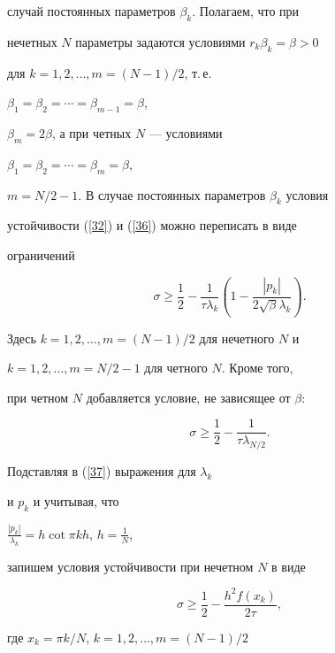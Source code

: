 случай постоянных параметров $\beta_k $. Полагаем, что при


нечетных $N$ параметры задаются условиями $r_k \beta_k=\beta> 0$


для $k=1,2,\dotsc,m=(N-1)/2$, т.\,е.


$\beta_1=\beta_2=\dotsb=\beta_{m-1}=\beta$,


$\beta_m=2\beta $, а при четных $N$ --- условиями 


$\beta_1=\beta_2=\dotsb=\beta_m=\beta$,


$m=N/2-1$. В случае постоянных параметров $\beta_k $ условия


устойчивости (\ref{32}) и (\ref{36}) можно переписать в виде


ограничений


\begin{equation}\label{37}


\sigma \geqslant \frac{1} {2}-\frac{1} {{\tau \lambda_k


}}\left({1-\frac{{| {p_k}|}} {{2\sqrt \beta


\lambda_k}}} \right).


\end{equation}


Здесь $k=1,2,\dotsc,m=(N-1)/2$ для нечетного $N$ и


$k=1,2,\dotsc,m=N/2-1$ для четного $N$. Кроме того,


при четном $N$ добавляется условие, не зависящее от $\beta $:


\begin{equation}\label{38}


\sigma \geqslant \frac{1} {2}-\frac{1} {{\tau \lambda_{N/2}}}.


\end{equation}


Подставляя в (\ref{37}) выражения для ${\lambda_k}$


и ${p_k}$ и учитывая, что


$\frac{{| {p_k}|}} {{\lambda_k}}=h\cot\pi kh$, $h=\frac{1} {N}$,


запишем условия устойчивости при нечетном $N$ в виде


\begin{equation}\label{39}


\sigma \geqslant \frac{1} {2}-\frac{{h^2 f(x_k)}} {{2\tau}},


\end{equation}


где $x_k=\pi k/N$, $k=1,2,\dotsc,m=(N-1)/2$


